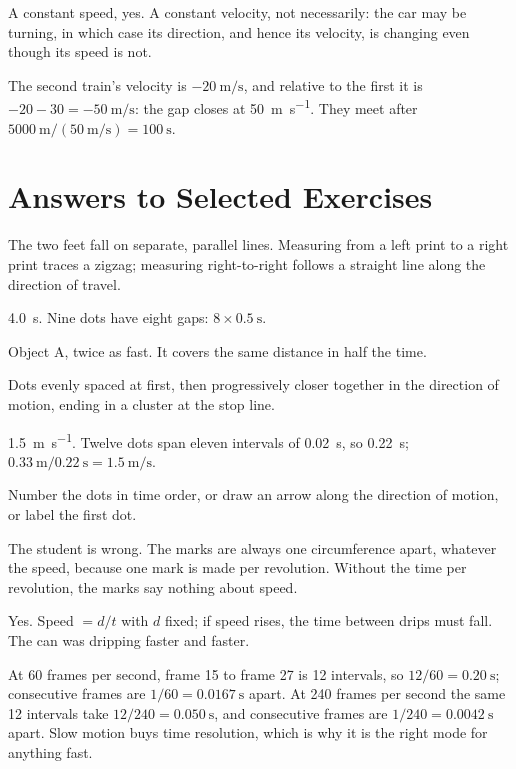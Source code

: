 \documentclass[11pt,twoside,openany]{book}
\begin{document}
\begin{description}[leftmargin=2em,itemsep=2pt]
  \item[1.11] A constant speed, yes. A constant velocity, not necessarily: the car may be turning, in which case its direction, and hence its velocity, is changing even though its speed is not.
  \item[1.12] The second train's velocity is $\SI{-20}{\metre\per\second}$, and relative to the first it is $-20 - 30 = \SI{-50}{\metre\per\second}$: the gap closes at \SI{50}{\metre\per\second}. They meet after $\SI{5000}{\metre}/(\SI{50}{\metre\per\second}) = \SI{100}{\second}$.
\end{description}

\section*{Answers to Selected Exercises}
\begin{description}[leftmargin=2.6em,itemsep=3pt,style=sameline]
  \item[1.1] The two feet fall on separate, parallel lines. Measuring from a left print to a right print traces a zigzag; measuring right-to-right follows a straight line along the direction of travel.
  \item[1.2] \SI{4.0}{\second}. Nine dots have eight gaps: $8 \times \SI{0.5}{\second}$.
  \item[1.3] Object A, twice as fast. It covers the same distance in half the time.
  \item[1.4] Dots evenly spaced at first, then progressively closer together in the direction of motion, ending in a cluster at the stop line.
  \item[1.5] \SI{1.5}{\metre\per\second}. Twelve dots span eleven intervals of \SI{0.02}{\second}, so \SI{0.22}{\second}; $\SI{0.33}{\metre}/\SI{0.22}{\second} = \SI{1.5}{\metre\per\second}$.
  \item[1.6] Number the dots in time order, or draw an arrow along the direction of motion, or label the first dot.
  \item[1.7] The student is wrong. The marks are always one circumference apart, whatever the speed, because one mark is made per revolution. Without the time per revolution, the marks say nothing about speed.
  \item[1.8] Yes. Speed $= d/t$ with $d$ fixed; if speed rises, the time between drips must fall. The can was dripping faster and faster.
  \item[1.9] At \num{60} frames per second, frame \num{15} to frame \num{27} is \num{12} intervals, so $12/60 = \SI{0.20}{\second}$; consecutive frames are $1/60 = \SI{0.0167}{\second}$ apart. At \num{240} frames per second the same \num{12} intervals take $12/240 = \SI{0.050}{\second}$, and consecutive frames are $1/240 = \SI{0.0042}{\second}$ apart. Slow motion buys time resolution, which is why it is the right mode for anything fast.

\end{description}
\end{document}
